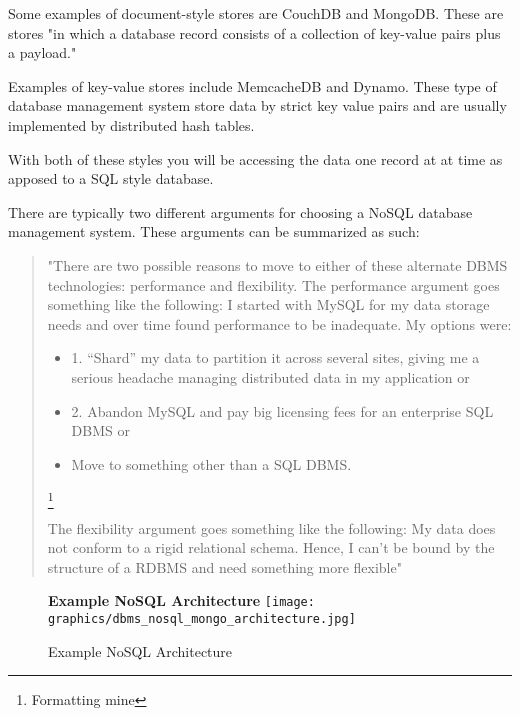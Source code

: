 \documentclass[letterpaper, 12pt]{article}
\begin{document}
Some examples of document-style stores are CouchDB and MongoDB. These are stores 
"in which a database record consists of a collection of key-value pairs plus a payload."
\cite{stonebraker2010sql}
\par\vspace{\baselineskip}
Examples of key-value stores include MemcacheDB and Dynamo. These type of database 
management system store data by strict key value pairs and are usually implemented by 
distributed hash tables.
\par\vspace{\baselineskip}
With both of these styles you will be accessing the data one record at 
at time as apposed to a SQL style database.
\par\vspace{\baselineskip}
There are typically two different arguments for choosing a NoSQL database management 
system. These arguments can be summarized as such:

\begin{quote}
"There are two possible reasons
to move to either of these alternate
DBMS technologies: performance and
flexibility.
The performance argument goes
something like the following: I started
with MySQL for my data storage needs
and over time found performance to be
inadequate. My options were:

\begin{itemize}
  \item 1. “Shard” my data to partition it
across several sites, giving me a serious
headache managing distributed data
in my application or
  \item 2. Abandon MySQL and pay big licensing
fees for an enterprise SQL
DBMS or 
\item Move to something other
than a SQL DBMS.
\end{itemize}\footnote{Formatting mine}

The flexibility argument goes something
like the following: My data does
not conform to a rigid relational schema.
Hence, I can’t be bound by the
structure of a RDBMS and need something
more flexible"
\end{quote} \cite{stonebraker2010sql}

\begin{figure}
  \centering
  \textbf{Example NoSQL Architecture}
  \texttt{[image: graphics/dbms\_nosql\_mongo\_architecture.jpg]}
  \caption{Example NoSQL Architecture}
  \citep{mongodb_architecture}
\end{figure}
\end{document}

